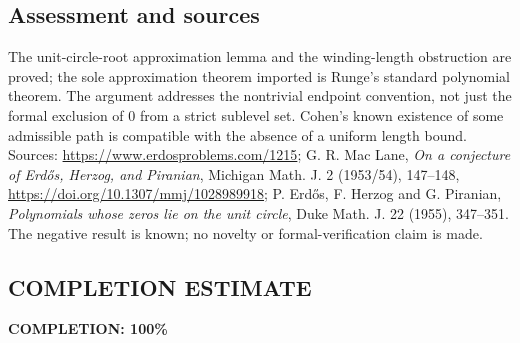 \subsection*{Assessment and sources}
The unit-circle-root approximation lemma and the winding-length obstruction are proved; the sole approximation theorem imported is Runge's standard polynomial theorem. The argument addresses the nontrivial endpoint convention, not just the formal exclusion of $0$ from a strict sublevel set. Cohen's known existence of some admissible path is compatible with the absence of a uniform length bound.
Sources: \url{https://www.erdosproblems.com/1215}; G. R. Mac Lane, \emph{On a conjecture of Erd\H{o}s, Herzog, and Piranian}, Michigan Math. J. 2 (1953/54), 147--148, \url{https://doi.org/10.1307/mmj/1028989918}; P. Erd\H{o}s, F. Herzog and G. Piranian, \emph{Polynomials whose zeros lie on the unit circle}, Duke Math. J. 22 (1955), 347--351. The negative result is known; no novelty or formal-verification claim is made.
\subsection*{COMPLETION ESTIMATE}
\textbf{COMPLETION: 100\%}
